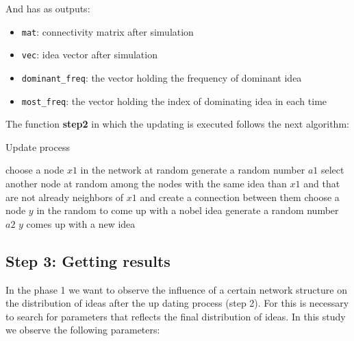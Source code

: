  And has as outputs:
 \begin{itemize}
 \item \verb+mat+: connectivity matrix after simulation
\item \verb+vec+: idea vector after simulation
\item \verb+dominant_freq+: the vector holding the frequency of dominant idea
 \item \verb+most_freq+: the vector holding the index of dominating idea in each time
\end{itemize}

\bigskip
\noindent The function \textbf{step2} in which the updating is executed follows the next algorithm:

\begin{algorithm}                      %
\caption{Update process}          %
\label{alg1}                           %
\begin{algorithmic}                    %
    	\State choose a node $x1$ in the network at random
	\State generate a random number $a1$
     
        \State select another node at random among the nodes with the same idea than $x1$ and that are not already neighbors of $x1$ and create a connection between them
            \EndIf
    \State choose a node $y$ in the random to come up with a nobel idea
    \State generate a random number $a2$
     $y$ comes up with a new idea 
     \EndIf
   \EndFor
\end{algorithmic}
\end{algorithm}

\subsection{Step 3: Getting results}

In the phase 1 we want to observe the influence of a certain network structure  on the distribution of ideas after the up dating process (step 2). For this is necessary to search for parameters that reflects the final distribution of ideas. In this study we observe the following parameters:

